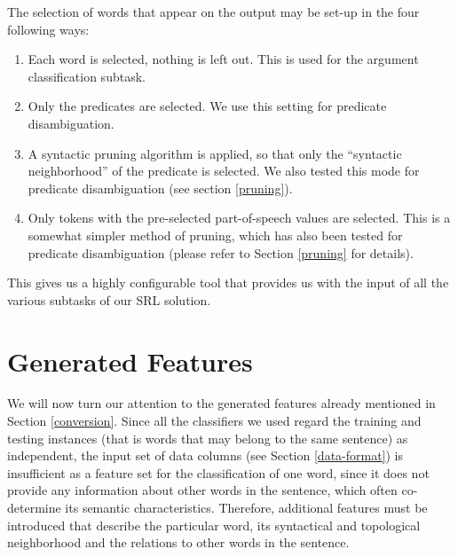 \documentclass[12pt,notitlepage,a4paper]{report}
\begin{document}
The selection of words that appear on the output may be set-up in the four following ways:
\begin{enumerate}
    \item Each word is selected, nothing is left out. This is used for the argument classification subtask.
    \item Only the predicates are selected. We use this setting for predicate disambiguation.
    \item A syntactic pruning algorithm \citep{asahara09,zhao09} is applied, so that only the ``syntactic neighborhood'' of the predicate is selected. We also tested this mode for predicate disambiguation (see section \ref{pruning}).
    \item Only tokens with the pre-selected part-of-speech values are selected. This is a somewhat simpler method of pruning, which has also been tested for predicate disambiguation (please refer to Section \ref{pruning} for details).
\end{enumerate}

This gives us a highly configurable tool that provides us with the input of all the various subtasks of our SRL solution.

\section{Generated Features}\label{features}

We will now turn our attention to the generated features already mentioned in Section \ref{conversion}. Since all the classifiers we used regard the training and testing instances (that is words that may belong to the same sentence) as independent, the input set of data columns (see Section \ref{data-format}) is insufficient as a feature set for the classification of one word, since it does not provide any information about other words in the sentence, which often co-determine its semantic characteristics. Therefore, additional features must be introduced that describe the particular word, its syntactical and topological neighborhood and the relations to other words in the sentence.
\end{document}
